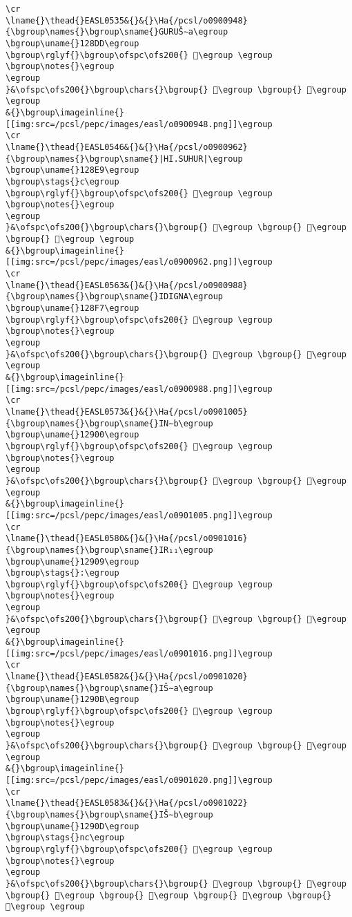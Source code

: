 \begin{verbatim}
\cr
\lname{}\thead{}EASL0535&{}&{}\Ha{/pcsl/o0900948}{\bgroup\names{}\bgroup\sname{}GURUŠ∼a\egroup
\bgroup\uname{}128DD\egroup
\bgroup\rglyf{}\bgroup\ofspc\ofs200{} 𒣝\egroup \egroup
\bgroup\notes{}\egroup
\egroup
}&\ofspc\ofs200{}\bgroup\chars{}\bgroup{} 𒣛\egroup \bgroup{} 𒣝\egroup \egroup
&{}\bgroup\imageinline{}[[img:src=/pcsl/pepc/images/easl/o0900948.png]]\egroup
\cr
\lname{}\thead{}EASL0546&{}&{}\Ha{/pcsl/o0900962}{\bgroup\names{}\bgroup\sname{}|HI.SUHUR|\egroup
\bgroup\uname{}128E9\egroup
\bgroup\stags{}c\egroup
\bgroup\rglyf{}\bgroup\ofspc\ofs200{} 𒣩\egroup \egroup
\bgroup\notes{}\egroup
\egroup
}&\ofspc\ofs200{}\bgroup\chars{}\bgroup{} 𒣧\egroup \bgroup{} 𒣨\egroup \bgroup{} 𒣩\egroup \egroup
&{}\bgroup\imageinline{}[[img:src=/pcsl/pepc/images/easl/o0900962.png]]\egroup
\cr
\lname{}\thead{}EASL0563&{}&{}\Ha{/pcsl/o0900988}{\bgroup\names{}\bgroup\sname{}IDIGNA\egroup
\bgroup\uname{}128F7\egroup
\bgroup\rglyf{}\bgroup\ofspc\ofs200{} 𒣷\egroup \egroup
\bgroup\notes{}\egroup
\egroup
}&\ofspc\ofs200{}\bgroup\chars{}\bgroup{} 𒣸\egroup \bgroup{} 𒣷\egroup \egroup
&{}\bgroup\imageinline{}[[img:src=/pcsl/pepc/images/easl/o0900988.png]]\egroup
\cr
\lname{}\thead{}EASL0573&{}&{}\Ha{/pcsl/o0901005}{\bgroup\names{}\bgroup\sname{}IN∼b\egroup
\bgroup\uname{}12900\egroup
\bgroup\rglyf{}\bgroup\ofspc\ofs200{} 𒤀\egroup \egroup
\bgroup\notes{}\egroup
\egroup
}&\ofspc\ofs200{}\bgroup\chars{}\bgroup{} 𒤀\egroup \bgroup{} 𒤁\egroup \egroup
&{}\bgroup\imageinline{}[[img:src=/pcsl/pepc/images/easl/o0901005.png]]\egroup
\cr
\lname{}\thead{}EASL0580&{}&{}\Ha{/pcsl/o0901016}{\bgroup\names{}\bgroup\sname{}IR₁₁\egroup
\bgroup\uname{}12909\egroup
\bgroup\stags{}:\egroup
\bgroup\rglyf{}\bgroup\ofspc\ofs200{} 𒤉\egroup \egroup
\bgroup\notes{}\egroup
\egroup
}&\ofspc\ofs200{}\bgroup\chars{}\bgroup{} 𒤈\egroup \bgroup{} 𒤉\egroup \egroup
&{}\bgroup\imageinline{}[[img:src=/pcsl/pepc/images/easl/o0901016.png]]\egroup
\cr
\lname{}\thead{}EASL0582&{}&{}\Ha{/pcsl/o0901020}{\bgroup\names{}\bgroup\sname{}IŠ∼a\egroup
\bgroup\uname{}1290B\egroup
\bgroup\rglyf{}\bgroup\ofspc\ofs200{} 𒤋\egroup \egroup
\bgroup\notes{}\egroup
\egroup
}&\ofspc\ofs200{}\bgroup\chars{}\bgroup{} 𒤌\egroup \bgroup{} 𒤋\egroup \egroup
&{}\bgroup\imageinline{}[[img:src=/pcsl/pepc/images/easl/o0901020.png]]\egroup
\cr
\lname{}\thead{}EASL0583&{}&{}\Ha{/pcsl/o0901022}{\bgroup\names{}\bgroup\sname{}IŠ∼b\egroup
\bgroup\uname{}1290D\egroup
\bgroup\stags{}nc\egroup
\bgroup\rglyf{}\bgroup\ofspc\ofs200{} 𒤍\egroup \egroup
\bgroup\notes{}\egroup
\egroup
}&\ofspc\ofs200{}\bgroup\chars{}\bgroup{} 𒤍\egroup \bgroup{} 𒤎\egroup \bgroup{} 𒤏\egroup \bgroup{} 𒤐\egroup \bgroup{} 𒤑\egroup \bgroup{} 𒤒\egroup \egroup

\end{verbatim}
